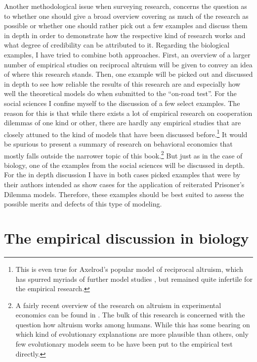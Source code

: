 Another methodological issue when surveying research, concerns the question as
to whether one should give a broad overview covering as much of the
research as possible or whether one should rather pick out a few examples and
discuss them in depth in order to demonstrate how the respective kind of
research works and what degree of credibility can be attributed to it.
Regarding the biological examples, I have tried to combine both approaches.
First, an overview of a larger number of empirical studies on reciprocal
altruism will be given to convey an idea of where this research stands. Then, 
one example will be picked out and discussed in depth to see how reliable the
results of this research are and especially how well the theoretical models do
when submitted to the ``on-road test''. For the social sciences I confine
myself to the discussion of a few select examples. The reason for this is that
while there exists a lot of empirical research on cooperation dilemmas of one
kind or other, there are hardly any empirical studies that are closely attuned
to the kind of models that have been discussed before.\footnote{This is even
  true for Axelrod's popular model of reciprocal altruism, which has spurred
  myriads of further model studies \cite[p.\ 24ff.]{dugatkin:1997}, but
  remained quite infertile for the empirical research.} It would be spurious
to present a summary of research on behavioral economics that mostly falls
outside the narrower topic of this book.\footnote{A fairly recent overview of the 
research on altruism in experimental economics can be found in \cite[]{fehr-fischbacher:2003}.
The bulk of this research is concerned with the question how altruism works among humans. While this
has some bearing on which kind of evolutionary explanations are more plausible than others, only few evolutionary models seem to be have been put to the empirical test directly.} But just as in the case of biology, one of the examples from the social sciences will be discussed in depth. For
the in depth discussion I have in both cases picked examples that were by
their authors intended as show cases for the application of reiterated
Prisoner's Dilemma models.  Therefore, these examples should be best suited to
assess the possible merits and defects of this type of modeling.

\section{The empirical discussion in biology}
\label{biology}

